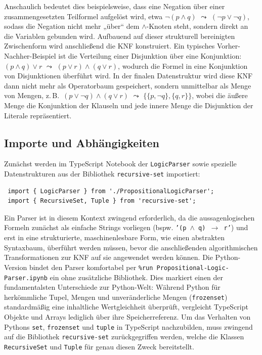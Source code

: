 Anschaulich bedeutet dies beispielsweise, dass eine Negation über einer zusammengesetzten Teilformel aufgelöst wird, etwa \(\neg(p \land q)\) \(\leadsto\) \((\neg p \lor \neg q)\), sodass die Negation nicht mehr „über“ dem \(\land\)-Knoten steht, sondern direkt an die Variablen gebunden wird. Aufbauend auf dieser strukturell bereinigten Zwischenform wird anschließend die \ac{KNF} konstruiert. Ein typisches Vorher-Nachher-Beispiel ist die Verteilung einer Disjunktion über eine Konjunktion: \((p \land q) \lor r\) \(\leadsto\) \((p \lor r) \land (q \lor r)\), wodurch die Formel in eine Konjunktion von Disjunktionen überführt wird.  In der finalen Datenstruktur wird diese \ac{KNF} dann nicht mehr als Operatorbaum gespeichert, sondern unmittelbar als Menge von Mengen, z.\,B.\ \((p \lor \neg q) \land (q \lor r)\) \(\leadsto\) \(\{\{p,\neg q\},\{q,r\}\}\), wobei die äußere Menge die Konjunktion der Klauseln und jede innere Menge die Disjunktion der Literale repräsentiert. 

\subsection{Importe und Abhängigkeiten}
Zunächst werden im TypeScript Notebook der \texttt{LogicParser} sowie spezielle Datenstrukturen aus der Bibliothek \texttt{recursive-set} importiert:
\begin{verbatim}
 import { LogicParser } from './PropositionalLogicParser';
 import { RecursiveSet, Tuple } from 'recursive-set';
\end{verbatim}


Ein Parser ist in diesem Kontext zwingend erforderlich, da die aussagenlogischen Formeln zunächst als einfache Strings vorliegen (bspw. \texttt{'(p \(\land\) q) \(\rightarrow\) r'})
und erst in eine strukturierte, maschinenlesbare Form, wie einen abstrakten Syntaxbaum, überführt werden müssen, bevor die anschließenden algorithmischen Transformationen zur \ac{KNF} auf sie angewendet werden können. Die Python-Version bindet den Parser komfortabel per \texttt{\%run Propositional-Logic-Parser.ipynb} ein ohne zusätzliche Bibliothek. 
Dies markiert einen der fundamentalsten Unterschiede zur Python-Welt: Während Python für herkömmliche Tupel, Mengen und unveränderliche Mengen (\texttt{frozenset}) standardmäßig eine inhaltliche Wertgleichheit überprüft, vergleicht TypeScript Objekte und Arrays lediglich über ihre Speicherreferenz. Um das Verhalten von Pythons \texttt{set}, \texttt{frozenset} und \texttt{tuple} in TypeScript nachzubilden, muss zwingend auf die Bibliothek \texttt{recursive-set} zurückgegriffen werden, welche die Klassen \texttt{RecursiveSet} und \texttt{Tuple} für genau diesen Zweck bereitstellt.







